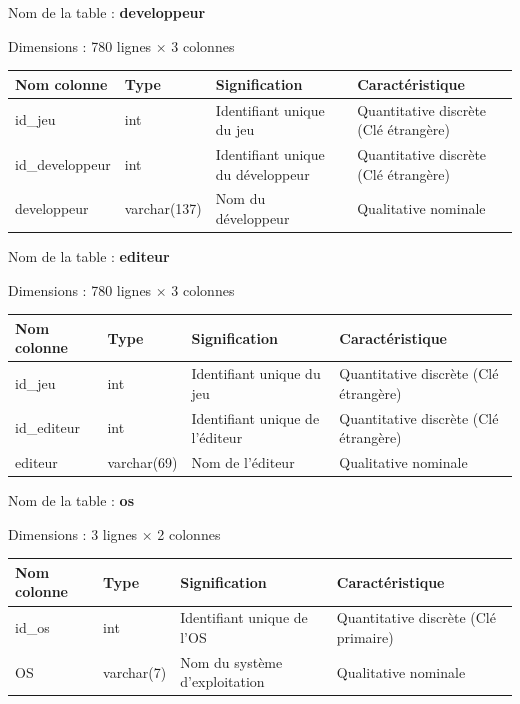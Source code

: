 \documentclass[mstat,12pt]{unswthesis}
\begin{document}
\vspace{1em}
\noindent Nom de la table : \textbf{developpeur}

\noindent Dimensions : 780 lignes × 3 colonnes

\begin{center}
\begin{tabular}{|p{3cm}|p{2.5cm}|p{3.5cm}|p{3.5cm}|}
\hline
\textbf{Nom colonne} & \textbf{Type} & \textbf{Signification} & \textbf{Caractéristique} \\
\hline
id\_jeu & int & Identifiant unique du jeu & Quantitative discrète (Clé étrangère) \\
\hline
id\_developpeur & int & Identifiant unique du développeur & Quantitative discrète (Clé étrangère) \\
\hline
developpeur & varchar(137) & Nom du développeur & Qualitative nominale \\
\hline
\end{tabular}
\end{center}

\vspace{1em}
\noindent Nom de la table : \textbf{editeur}

\noindent Dimensions : 780 lignes × 3 colonnes

\begin{center}
\begin{tabular}{|p{3cm}|p{2.5cm}|p{3.5cm}|p{3.5cm}|}
\hline
\textbf{Nom colonne} & \textbf{Type} & \textbf{Signification} & \textbf{Caractéristique} \\
\hline
id\_jeu & int & Identifiant unique du jeu & Quantitative discrète (Clé étrangère) \\
\hline
id\_editeur & int & Identifiant unique de l'éditeur & Quantitative discrète (Clé étrangère) \\
\hline
editeur & varchar(69) & Nom de l'éditeur & Qualitative nominale \\
\hline
\end{tabular}
\end{center}

\vspace{1em}
\noindent Nom de la table : \textbf{os}

\noindent Dimensions : 3 lignes × 2 colonnes

\begin{center}
\begin{tabular}{|p{3cm}|p{2.5cm}|p{3.5cm}|p{3.5cm}|}
\hline
\textbf{Nom colonne} & \textbf{Type} & \textbf{Signification} & \textbf{Caractéristique} \\
\hline
id\_os & int & Identifiant unique de l'OS & Quantitative discrète (Clé primaire) \\
\hline
OS & varchar(7) & Nom du système d'exploitation & Qualitative nominale \\
\hline
\end{tabular}
\end{center}
\end{document}
